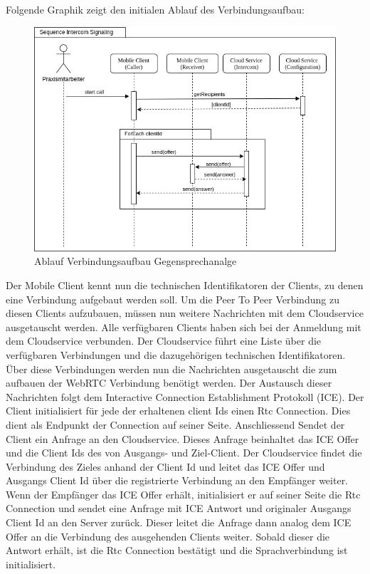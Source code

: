 Folgende Graphik zeigt den initialen Ablauf des Verbindungsaufbau:

\begin{figure}[h]
    \centering
    \begin{minipage}[b]{0.9\textwidth}
        \includegraphics[width=\textwidth]{graphics/diagramms/Sequence_Intercom_Broking_V02}
        \caption{Ablauf Verbindungsaufbau Gegensprechanalge}
    \end{minipage}
\end{figure}









Der Mobile Client kennt nun die technischen Identifikatoren der Clients, zu denen eine Verbindung aufgebaut werden soll.
Um die Peer To Peer Verbindung zu diesen Clients aufzubauen, müssen nun weitere Nachrichten mit dem Cloudservice ausgetauscht werden.
Alle verfügbaren Clients haben sich bei der Anmeldung mit dem Cloudservice verbunden.
Der Cloudservice führt eine Liste über die verfügbaren Verbindungen und die dazugehörigen technischen Identifikatoren.
Über diese Verbindungen werden nun die Nachrichten ausgetauscht die zum aufbauen der WebRTC Verbindung benötigt werden.
Der Austausch dieser Nachrichten folgt dem Interactive Connection Establishment Protokoll (ICE).
Der Client initialisiert für jede der erhaltenen client Ids einen Rtc Connection.
Dies dient als Endpunkt der Connection auf seiner Seite.
Anschliessend Sendet der Client ein Anfrage an den Cloudservice.
Dieses Anfrage beinhaltet das ICE Offer und die Client Ids des von Ausgangs- und Ziel-Client.
Der Cloudservice findet die Verbindung des Zieles anhand der Client Id und leitet das ICE Offer und Ausgangs Client Id über die registrierte Verbindung an den Empfänger weiter.
Wenn der Empfänger das ICE Offer erhält, initialisiert er auf seiner Seite die Rtc Connection und sendet eine Anfrage mit ICE Antwort und originaler Ausgangs Client Id an den Server zurück.
Dieser leitet die Anfrage dann analog dem ICE Offer an die Verbindung des ausgehenden Clients weiter.
Sobald dieser die Antwort erhält, ist die Rtc Connection bestätigt und die Sprachverbindung ist initialisiert.


